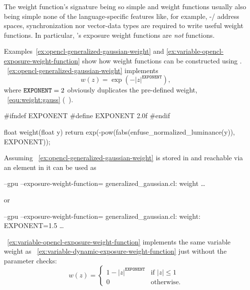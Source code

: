 \begin{geeknote}
  The weight function's signature being so simple and weight functions usually also being simple
  none of the language-specific features like, for example, -\slash{}
  address spaces, synchronization nor vector-data types are required to write useful weight
  functions.  In particular, \App's  exposure weight functions are \emph{not}
   functions.
\end{geeknote}

Examples~\ref{ex:opencl-generalized-gaussian-weight} and
\ref{ex:variable-opencl-exposure-weight-function} show how weight functions can be constructed
using .  \exampleName~\ref{ex:opencl-generalized-gaussian-weight} implements
\[
    w(z) = \exp\left(-|z|^{\mathtt{EXPONENT}}\right),
\]
where $\texttt{EXPONENT} = 2$ obviously duplicates the pre-defined  weight,
\equationabbr~\ref{equ:weight:gauss} (\pageabbr~\pageref{equ:weight:gauss}).

\begin{exemplar}
  \begin{cxxlisting}
#ifndef EXPONENT
#define EXPONENT 2.0f
#endif

float weight(float y)
{
    return exp(-pow(fabs(enfuse_normalized_luminance(y)),
                    EXPONENT));
}
  \end{cxxlisting}

  \caption[Generalized  weight function]%
          {\label{ex:opencl-generalized-gaussian-weight}%
            Generalized  weight function written in .  Note
            the definition of the default parameter~.}
\end{exemplar}

Assuming \exampleName~\ref{ex:opencl-generalized-gaussian-weight} is stored in
 and reachable via an element in
 it can be used as
\begin{literal}
  \app{} --gpu --exposure-weight-function=\feasiblebreak
  generalized\_gaussian.cl:\feasiblebreak
  weight \dots
\end{literal}
or
\begin{literal}
  \app{} --gpu --exposure-weight-function=\feasiblebreak
  generalized\_gaussian.cl:\feasiblebreak
  weight:\feasiblebreak
  EXPONENT=1.5 \dots
\end{literal}

\exampleName~\ref{ex:variable-opencl-exposure-weight-function} implements the same variable
weight as \exampleName~\ref{ex:variable-dynamic-exposure-weight-function} just without the
parameter checks:
\[
    w(z) =
    \left\{
      \begin{array}{cl}
        1 - |z|^{\mathtt{EXPONENT}} & \mbox{if } |z| \leq 1 \\
        0                         & \mbox{otherwise.}
      \end{array}
    \right.
\]

